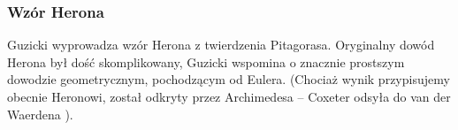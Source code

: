%
\subsubsection{Wzór Herona}

Guzicki \cite[s. 165-168]{guzicki_2021} wyprowadza wzór Herona z twierdzenia Pitagorasa.
Oryginalny dowód Herona był dość skomplikowany, Guzicki \cite[s. 168-169]{guzicki_2021} wspomina o znacznie prostszym dowodzie geometrycznym, pochodzącym od Eulera.
%
(Chociaż wynik przypisujemy obecnie Heronowi, został odkryty przez Archimedesa -- Coxeter \cite[s. 12]{coxeter_1991} odsyła do van der Waerdena \cite{MISSING_CITATION}).



%